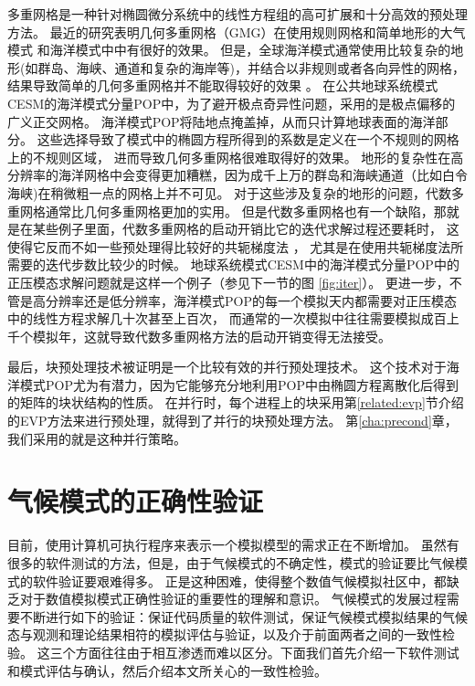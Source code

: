 多重网格是一种针对椭圆微分系统中的线性方程组的高可扩展和十分高效的预处理方法。 
最近的研究表明几何多重网格（GMG）在使用规则网格和简单地形的大气模式
 \cite{muller2014massively}和海洋模式中\cite{matsumura2008non,kanarska2007algorithm}中有很好的效果。 
但是，全球海洋模式通常使用比较复杂的地形(如群岛、海峡、通道和复杂的海岸等)，并结合以非规则或者各向异性的网格， 结果导致简单的几何多重网格并不能取得较好的效果
\cite{matsumura2008non,fulton1986multigrid,tseng2003ghost,stuben2001review}。 
在公共地球系统模式CESM的海洋模式分量POP中，为了避开极点奇异性问题，采用的是极点偏移的广义正交网格。 
海洋模式POP将陆地点掩盖掉，从而只计算地球表面的海洋部分。
这些选择导致了模式中的椭圆方程所得到的系数是定义在一个不规则的网格上的不规则区域， 进而导致几何多重网格很难取得好的效果。 
地形的复杂性在高分辨率的海洋网格中会变得更加糟糕，因为成千上万的群岛和海峡通道（比如白令海峡)在稍微粗一点的网格上并不可见。
对于这些涉及复杂的地形的问题，代数多重网格通常比几何多重网格更加的实用。 
但是代数多重网格也有一个缺陷，那就是在某些例子里面，代数多重网格的启动开销比它的迭代求解过程还要耗时，
这使得它反而不如一些预处理得比较好的共轭梯度法
\cite{muller2014massively}， 尤其是在使用共轭梯度法所需要的迭代步数比较少的时候。 
地球系统模式CESM中的海洋模式分量POP中的正压模态求解问题就是这样一个例子（参见下一节的图
 \ref{fig:iter}）。
更进一步，不管是高分辨率还是低分辨率，海洋模式POP的每一个模拟天内都需要对正压模态中的线性方程求解几十次甚至上百次，
而通常的一次模拟中往往需要模拟成百上千个模拟年，这就导致代数多重网格方法的启动开销变得无法接受。


最后，块预处理技术被证明是一个比较有效的并行预处理技术\cite{concus1985block, white2011block}。
这个技术对于海洋模式POP尤为有潜力，因为它能够充分地利用POP中由椭圆方程离散化后得到的矩阵的块状结构的性质。
在并行时，每个进程上的块采用第\ref{related:evp}节介绍的EVP方法来进行预处理，就得到了并行的块预处理方法。
第\ref{cha:precond}章，我们采用的就是这种并行策略。

\section{气候模式的正确性验证}
\label{related:verify}

目前，使用计算机可执行程序来表示一个模拟模型的需求正在不断增加。 
虽然有很多的软件测试的方法，但是，由于气候模式的不确定性，模式的验证要比气候模式的软件验证要艰难得多。
正是这种困难，使得整个数值气候模拟社区中，都缺乏对于数值模拟模式正确性验证的重要性的理解和意识\cite{whitner1989guidelines}。 
气候模式的发展过程需要不断进行如下的验证：保证代码质量的软件测试，保证气候模式模拟结果的气候态与观测和理论结果相符的模拟评估与验证，以及介于前面两者之间的一致性检验\cite{whitner1989guidelines,wittenberg2014enso,baker2015,oreskes1994verification}。
这三个方面往往由于相互渗透而难以区分。下面我们首先介绍一下软件测试和模式评估与确认，然后介绍本文所关心的一致性检验。

